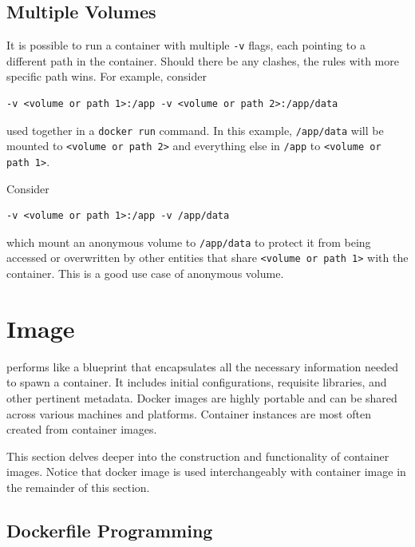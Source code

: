 \subsection{Multiple Volumes}

It is possible to run a container with multiple \verb|-v| flags, each pointing to a different path in the container. Should there be any clashes, the rules with more specific path wins. For example, consider
\begin{lstlisting}
-v <volume or path 1>:/app -v <volume or path 2>:/app/data
\end{lstlisting} 
used together in a \verb|docker run| command. In this example, \verb|/app/data| will be mounted to \verb|<volume or path 2>| and everything else in \verb|/app| to \verb|<volume or path 1>|. 

Consider
\begin{lstlisting}
-v <volume or path 1>:/app -v /app/data
\end{lstlisting} 
which mount an anonymous volume to \verb|/app/data| to protect it from being accessed or overwritten by other entities that share \verb|<volume or path 1>| with the container. This is a good use case of anonymous volume.

\section{Image} \label{ch:vac:sec:di}

 performs like a blueprint that encapsulates all the necessary information needed to spawn a container. It includes initial configurations, requisite libraries, and other pertinent metadata. Docker images are highly portable and can be shared across various machines and platforms. Container instances are most often created from container images.

This section delves deeper into the construction and functionality of container images. Notice that docker image is used interchangeably with container image in the remainder of this section. 

\subsection{Dockerfile Programming}

